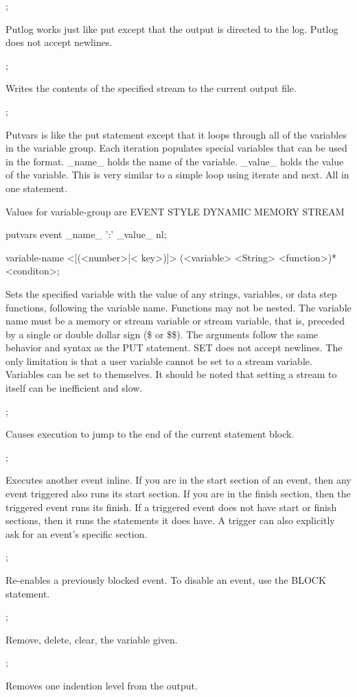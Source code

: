 \begin{description}
;

Putlog works just like put except that the output is directed to the log. 
Putlog does not accept newlines.

;

Writes the contents of the specified stream to the current output file. 

;

Putvars is like the put statement except that it loops through all of the variables in the variable group. Each iteration populates special variables that can be used in the format. \_name\_ holds the name of the variable. \_value\_ holds the value of the variable.  This is very similar to a simple loop using iterate and next.  All in one statement.

Values for variable-group are
EVENT
STYLE
DYNAMIC
MEMORY
STREAM

    putvars event   \_name\_ ':' \_value\_ nl;

 {variable-name <[(<number>|< key>)]> (<variable> <String> <function>)* <conditon>};

Sets the specified variable with the value of any strings, variables, or data step functions, following the variable name. Functions may not be nested. The variable name must be a memory or stream variable or stream variable, that is, preceded by a single or double dollar sign (\$ or \$\$). The arguments follow the same behavior and syntax as the PUT statement. SET does not accept newlines. The only limitation is that a user variable cannot be set to a stream variable. Variables can be set to themselves. It should be noted that setting a stream to itself can be inefficient and slow. 

;

Causes execution to jump to the end of the current statement block. 

;

Executes another event inline. If you are in the start section of an event, then any event triggered also runs its start section. If you are in the finish section, then the triggered event runs its finish. If a triggered event does not have start or finish sections, then it runs the statements it does have. A trigger can also explicitly ask for an event's specific section.


;

Re-enables a previously blocked event. To disable an event, use the BLOCK statement. 

;

Remove, delete, clear, the variable given.

;

Removes one indention level from the output.

\end{description}

